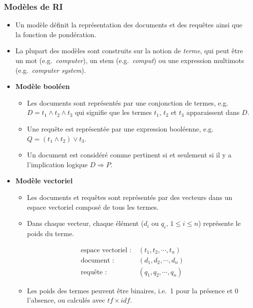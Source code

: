 \documentclass[11pt,aspectratio=43,dvipsnames,table]{beamer}
\begin{document}
\begin{frame}[allowframebreaks]
    \frametitle{Modèles de RI}
    \begin{itemize} \itemsep10pt
        \item Un modèle définit la représentation des documents et des requêtes 
              ainsi que la fonction de pondération.
        \item La plupart des modèles sont construits sur la notion de 
              \textit{terme}, qui peut être un mot (e.g.~\textit{computer}), un 
              stem (e.g.~\textit{comput}) ou une expression multimots 
              (e.g.~\textit{computer system}).

        \framebreak

        \item \textbf{Modèle booléen}
        \begin{itemize}
            \item Les documents sont représentés par une conjonction de termes, 
                  e.g.~$D = t_1 \land t_2 \land t_3$ qui signifie que les termes
                  $t_1$, $t_2$ et $t_3$ apparaissent dans $D$.
            \item Une requête est représentée par une expression booléenne, 
                  e.g.~$Q = (t_1 \land t_2) \lor t_3$.
            \item Un document est considéré comme pertinent si et seulement si 
                  il y a l'implication logique $D \Rightarrow P$.
        \end{itemize}

        \framebreak

        \item \textbf{Modèle vectoriel}~\cite{DBLP:journals/cacm/SaltonWY75,DBLP:books/mg/SaltonG83}
        \begin{itemize}
            \item Les documents et requêtes sont représentés par des vecteurs 
                  dans un espace vectoriel composé de tous les termes.
            \item Dans chaque vecteur, chaque élément ($d_i$ ou $q_i$, 
                  $1 \leq i \leq n$) représente le poids du terme.
        \end{itemize}
        \vspace*{-0.5em}
        \begin{align*}
          \text{espace vectoriel~:} &~(t_1, t_2, \cdots, t_n) \\
          \text{document~:} &~(d_1, d_2, \cdots, d_n) \\
          \text{requête~:} &~(q_1, q_2, \cdots, q_n)
        \end{align*}
        \vspace*{-1.5em}
        \begin{itemize}
            \item Les poids des termes peuvent être binaires, i.e.~1 pour la 
                  présence et 0 l'absence, ou calculés avec $tf \times idf$.


\end{itemize}
\end{itemize}
\end{frame}
\end{document}
